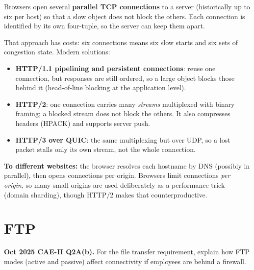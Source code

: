 \documentclass[11pt,a4paper]{article}
\begin{document}
\begin{solbox}
Browsers open several \textbf{parallel TCP connections} to a server (historically up to six per host) so that a slow object does not block the others. Each connection is identified by its own four-tuple, so the server can keep them apart.

That approach has costs: six connections means six slow starts and six sets of congestion state. Modern solutions:

\begin{itemize}
\item \textbf{HTTP/1.1 pipelining and persistent connections}: reuse one connection, but responses are still ordered, so a large object blocks those behind it (head-of-line blocking at the application level).
\item \textbf{HTTP/2}: one connection carries many \emph{streams} multiplexed with binary framing; a blocked stream does not block the others. It also compresses headers (HPACK) and supports server push.
\item \textbf{HTTP/3 over QUIC}: the same multiplexing but over UDP, so a lost packet stalls only its own stream, not the whole connection.
\end{itemize}

\textbf{To different websites:} the browser resolves each hostname by DNS (possibly in parallel), then opens connections per origin. Browsers limit connections \emph{per origin}, so many small origins are used deliberately as a performance trick (domain sharding), though HTTP/2 makes that counterproductive.
\end{solbox}

\section{FTP}

\begin{pyqbox}
\textbf{Oct 2025 CAE-II Q2A(b).} For the file transfer requirement, explain how FTP modes (active and passive) affect connectivity if employees are behind a firewall.
\end{pyqbox}
\end{document}
